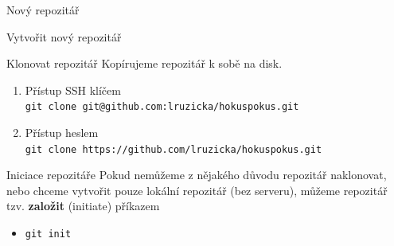 \documentclass[14pt]{beamer}
\renewcommand{\texttt}[1]{{{\tt\color{blue}#1}}}
\begin{document}
	\begin{frame}{Nový repozitář}
	\begin{center}
	\end{center}
	\end{frame}

	\begin{frame}{Vytvořit nový repozitář}
	\begin{center}
	\end{center}
	\end{frame}

	\begin{frame}{Klonovat repozitář}
		Kopírujeme repozitář k sobě na disk.
		\begin{enumerate}
		\item Přístup SSH klíčem \\ {\small \texttt{git clone git@github.com:lruzicka/hokuspokus.git}}
		\item Přístup heslem \\ \texttt{git clone {\small https://github.com/lruzicka/hokuspokus.git}}
	\end{enumerate}
	\end{frame}

	\begin{frame}{Iniciace repozitáře}
	Pokud nemůžeme z nějakého důvodu repozitář naklonovat, nebo chceme vytvořit pouze lokální repozitář (bez serveru), můžeme repozitář tzv. \textbf{založit} (initiate) příkazem
	\begin{itemize}
		\item \texttt{git init}
	\end{itemize}
	\end{frame}
\end{document}
